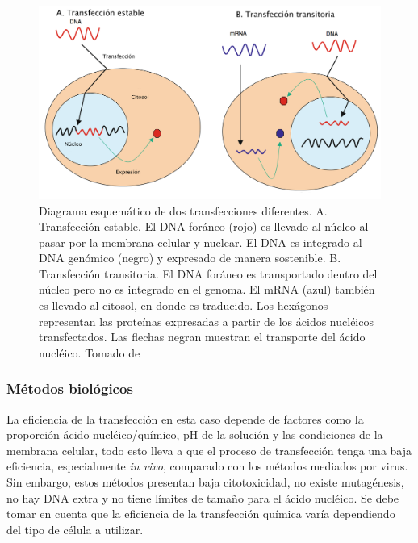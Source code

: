 \documentclass[fleqn,10pt]{SelfArx} %
\begin{document}
\begin{figure}[ht]
\centering
\includegraphics[width=0.8\linewidth]{images/transfeccion.png}
\caption{Diagrama esquemático de dos transfecciones diferentes. A. Transfección estable. El DNA foráneo (rojo) es llevado al núcleo al pasar por la membrana celular y nuclear. El DNA es integrado al DNA genómico (negro) y expresado de manera sostenible. B. Transfección transitoria. El DNA foráneo es transportado dentro del núcleo pero no es integrado en el genoma. El mRNA (azul) también es llevado al citosol, en donde es traducido. Los hexágonos representan las proteínas expresadas a partir de los ácidos nucléicos transfectados. Las flechas negran muestran el transporte del ácido nucléico. Tomado de \cite{Recillas}}
\label{Fig:transfeccion}
\end{figure}

\subsubsection{Métodos biológicos}La eficiencia de la transfección en esta caso depende de factores como la proporción ácido nucléico/químico, pH de la solución y las condiciones de la membrana celular, todo esto lleva a que el proceso de transfección tenga una baja eficiencia, especialmente \textit{in vivo}, comparado con los métodos mediados por virus. Sin embargo, estos métodos presentan baja citotoxicidad, no existe mutagénesis, no hay DNA extra y no tiene límites de tamaño para el ácido nucléico. Se debe tomar en cuenta que la eficiencia de la transfección química varía dependiendo del tipo de célula a utilizar.
\end{document}
